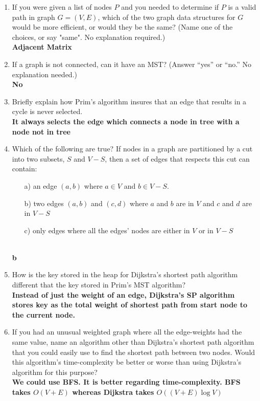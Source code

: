 \documentclass[10pt]{article}
\newcommand{\answer}[1]{\color{blue}\hfill\break\\\noindent\textbf{#1}\color{black}\hfill\break}
\begin{document}
    \begin{enumerate}
        \item If you were given a list of nodes $P$ and you needed to determine if $P$ is a valid path in graph $G = (V,E)$, which of the two graph data structures for $G$ would be more efficient, or would they be the same? (Name one of the choices, or say "same". No explanation required.)
            \answer{Adjacent Matrix} %

        \item If a graph is not connected, can it have an MST? (Answer ``yes'' or ``no.'' No explanation needed.)
            \answer{No} %

        \item Briefly explain how Prim's algorithm insures that an edge that results in a cycle is never selected.
            \answer{It always selects the edge which connects a node in tree with a node not in tree } %

        \item Which of the following are true? If nodes in a graph are partitioned by a cut into two subsets, $S$ and $V-S$, then a set of edges that respects this cut can contain:
            \begin{itemize}
                \item[a) ] an edge $(a,b)$ where $a \in V$ and $b \in V-S$.
                \item[b) ] two edges $(a,b)$ and $(c,d)$ where $a$ and $b$ are in $V$ and $c$ and $d$ are in $V-S$
                \item[c) ] only edges where all the edges' nodes are either in $V$ or in $V-S$
            \end{itemize}
            \answer{b} %

        \item How is the key stored in the heap for Dijkstra's shortest path algorithm different that the key stored in Prim's MST algorithm?
            \answer{Instead of just the weight of an edge, Dijkstra's SP algorithm stores key as the total weight of shortest path from start node to the current node. } %

        \item If you had an unusual weighted graph where all the edge-weights had the same value, name an algorithm other than Dijkstra's shortest path algorithm that you could easily use to find the shortest path between two nodes. Would this algorithm's time-complexity be better or worse than using Dijkstra's algorithm for this purpose?
            \answer{We could use BFS. It is better regarding time-complexity. BFS takes $O(V+E)$ whereas Dijkstra takes $O((V+E)\log V)$} %

    \end{enumerate}
\end{document}

